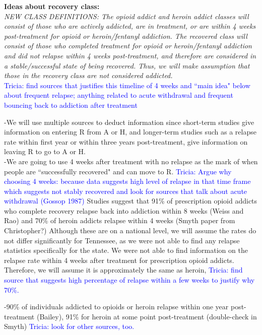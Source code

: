 \documentclass[12pt]{article}
\begin{document}
\noindent \textbf{Ideas about recovery class:} \\ 

\textit{NEW CLASS DEFINITIONS: The opioid addict and heroin addict classes will consist of those who are actively addicted, are in treatment, or are within 4 weeks post-treatment for opioid or heroin/fentanyl addiction. The recovered class will consist of those who completed treatment for opioid or heroin/fentanyl addiction and did not relapse within 4 weeks post-treatment, and therefore are considered in a stable/successful state of being recovered. Thus, we will make assumption that those in the recovery class are not considered addicted.}\\
\textcolor{blue}{Tricia: find sources that justifies this timeline of 4 weeks and ``main idea" below about frequent relapse; anything related to acute withdrawal and frequent bouncing back to addiction after treatment} 



-We will use multiple sources to deduct information since short-term studies give information on entering R from A or H, and longer-term studies such as a relapse rate within first year or within three years post-treatment, give information on leaving R to go to A or H. \\
-We are going to use 4 weeks after treatment with no relapse as the mark of when people are ``successfully recovered" and can move to R. \textcolor{blue}{Tricia: Argue why choosing 4 weeks: because data suggests high level of relapse in that time frame which suggests not stably recovered and look for sources that talk about acute withdrawal (Gossop 1987)}
Studies suggest that 91\% of prescription opioid addicts who complete recovery relapse back into addiction within 8 weeks (Weiss and Rao) and 70\% of heroin addicts relapse within 4 weeks (Smyth paper from Christopher?) Although these are on a national level, we will assume the rates do not differ significantly for Tennessee, as we were not able to find any relapse statistics specifically for the state. We were not able to find information on the relapse rate within 4 weeks after treatment for prescription opioid addicts. Therefore, we will assume it is approximately the same as heroin, \textcolor{blue}{Tricia: find source that suggests high percentage of relapse within a few weeks to justify why 70\%.} 


-90\% of individuals addicted to opioids or heroin relapse within one year post-treatment (Bailey), 91\% for heroin at some point post-treatment (double-check in Smyth) \textcolor{blue}{Tricia: look for other sources, too.}
\end{document}
